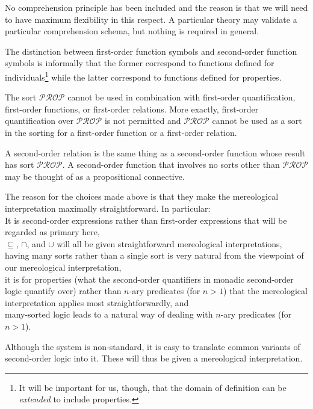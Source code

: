 \documentclass[12pt]{book}
\begin{document}
No comprehension principle has been included and the reason is that we will need to have maximum flexibility in this respect. A particular theory may validate a particular comprehension schema, but nothing is required in general.

The distinction between first-order function symbols and second-order function symbols is informally that the former correspond to functions defined for individuals\footnote{It will be important for us, though, that the domain of definition can be \textit{extended} to include properties.} while the latter correspond to functions defined for properties.

The sort $\mathcal{PROP}$ cannot be used in combination with first-order quantification, first-order functions, or first-order relations. More exactly, first-order quantification over $\mathcal{PROP}$ is not permitted and $\mathcal{PROP}$ cannot be used as a sort in the sorting for a first-order function or a first-order relation.

A second-order relation is the same thing as a second-order function whose result has sort $\mathcal{PROP}$. A second-order function that involves no sorts other than $\mathcal{PROP}$ may be thought of as a propositional connective.

The reason for the choices made above is that they make the mereological interpretation maximally straightforward. In particular:\\
\indent * It is second-order expressions rather than first-order expressions that will be regarded as primary here,\\
\indent * $\subseteq$, $\cap$, and $\cup$ will all be given straightforward mereological interpretations,\\
\indent * having many sorts rather than a single sort is very natural from the viewpoint of our mereological interpretation,\\
\indent * it is for properties (what the second-order quantifiers in monadic second-order logic quantify over) rather than $n$-ary predicates (for $n > 1$) that the mereological interpretation applies most straightforwardly, and\\
\indent * many-sorted logic leads to a natural way of dealing with $n$-ary predicates (for $n > 1$).

Although the system is non-standard, it is easy to translate common variants of second-order logic into it. These will thus be given a mereological interpretation.
\end{document}
